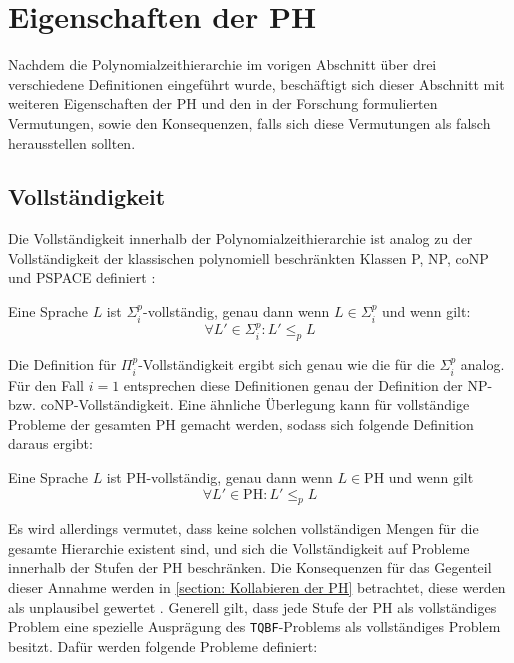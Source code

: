 \chapter{Eigenschaften der PH} \label{chapter: Eigenschaften der PH}
Nachdem die Polynomialzeithierarchie im vorigen Abschnitt über drei verschiedene Definitionen eingeführt wurde, beschäftigt sich dieser Abschnitt mit 
weiteren Eigenschaften der PH und den in der Forschung formulierten Vermutungen, sowie den Konsequenzen, falls sich diese Vermutungen als falsch herausstellen sollten.

\section{Vollständigkeit} \label{section: Vollständige Mengen innerhalb der PH}
Die Vollständigkeit innerhalb der Polynomialzeithierarchie ist analog zu der Vollständigkeit der klassischen polynomiell beschränkten Klassen
P, NP, coNP und PSPACE definiert \cite{arora_computational_2009}:

\begin{definition} \cite{arora_computational_2009}
    Eine Sprache $L$ ist $\Sigma^p_i$-vollständig, genau dann wenn $L \in \Sigma^p_i$ und wenn gilt: 
    $$
    \forall L' \in \Sigma^p_i : L' \leq_p L
    $$
\end{definition}

Die Definition für $\Pi^p_i$-Vollständigkeit ergibt sich genau wie die für die $\Sigma^p_i$ analog.
Für den Fall $i = 1$ entsprechen diese Definitionen genau der Definition der NP- bzw. coNP-Vollständigkeit.
Eine ähnliche Überlegung kann für vollständige Probleme der gesamten PH gemacht werden, sodass sich folgende Definition daraus ergibt:

\begin{definition}[PH-Vollständigkeit] \cite{arora_computational_2009}
    Eine Sprache $L$ ist PH-vollständig, genau dann wenn $L \in \text{PH}$ und wenn gilt 
    $$
    \forall L' \in \text{PH} : L' \leq_p L
    $$
\end{definition}

Es wird allerdings vermutet, dass keine solchen vollständigen Mengen für die gesamte Hierarchie existent sind, und sich die Vollständigkeit auf Probleme innerhalb der
Stufen der PH beschränken. Die Konsequenzen für das Gegenteil dieser Annahme werden in \ref{section: Kollabieren der PH} betrachtet, diese werden als unplausibel gewertet \cite{arora_computational_2009}.
Generell gilt, dass jede Stufe der PH als vollständiges Problem eine spezielle Ausprägung des \texttt{TQBF}-Problems als vollständiges Problem besitzt.
Dafür werden folgende Probleme definiert:

